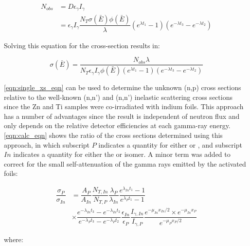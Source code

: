 \documentclass[5p]{elsarticle}
\newcommand{\pp}[1]{\left( #1\right)}
\begin{document}
\begin{align}
N_{obs} &= D \epsilon_\gamma I_\gamma \\
&=  \epsilon_\gamma I_\gamma  \dfrac{N_T \sigma\pp{\bar{E}} \phi\pp{\bar{E}} }{\lambda}\pp{e^{\lambda t_1}-1}\pp{e^{-\lambda t_3} - e^{-\lambda t_2}} \nonumber
\end{align}

Solving this equation for the  cross-section results in:

\begin{equation}\label{eqn:single_xs_eqn}
\sigma\pp{\bar{E}} = \dfrac{N_{obs}\lambda}{N_T \epsilon_\gamma I_\gamma  \phi\pp{\bar{E}}  \pp{e^{\lambda t_1}-1}\pp{e^{-\lambda t_3} - e^{-\lambda t_2}}}
\end{equation}

\autoref{eqn:single_xs_eqn} can be used to determine the unknown (n,p) cross sections relative to the well-known (n,n') and (n,n') inelastic scattering cross sections since the Zn and Ti samples were co-irradiated with indium foils. This approach has a number of advantages since the result is independent of neutron flux and only depends on the relative detector efficiencies at each gamma-ray energy.  \autoref{eqn:calc_eqn} shows the ratio of the cross sections determined using this approach, in which subscript $P$ indicates a quantity for either  or , and subscript $In$ indicates a quantity for either the  or  isomer. A minor term was added to correct for the small self-attenuation of the gamma rays emitted by the activated foils:



\begin{align}\label{eqn:calc_eqn}
\dfrac{\sigma_P}{\sigma_{In}} &=  \dfrac{A_P}{A_{In}} \dfrac{N_{T,In}}{N_{T,P}} \dfrac{\lambda_P}{\lambda_{In}} \dfrac{e^{\lambda_{In}t_1}-1}{e^{\lambda_{P}t_1}-1}  \\
&\times \dfrac{e^{-\lambda_{In}t_3}-e^{-\lambda_{In}t_2}}{e^{-\lambda_{P}t_3} - e^{-\lambda_{P}t_2}} \dfrac{\epsilon_{In}}{\epsilon_P}  \dfrac{I_{\gamma,In}}{I_{\gamma,P}} \dfrac{e^{-\mu_{In}x_{In}/2}\times e^{-\mu_{In}x_{P}}}{e^{-\mu_{P}x_{P}/2}} \nonumber
\end{align}

where:
\end{document}
